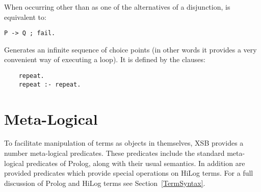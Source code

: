 \begin{description}
  
    When occurring other than as one of the alternatives of a disjunction,
    is equivalent to:
	\begin{center}
	{\tt P -> Q ; fail.}
	\end{center}

  
    Generates an infinite sequence of choice points (in other words it 
    provides a very convenient way of executing a loop). It is defined 
    by the clauses:
    \begin{center}
    \begin{minipage}{1.5in}
    \begin{verbatim}
	repeat.
	repeat :- repeat.
    \end{verbatim}
    \end{minipage}
    \end{center}

\end{description}


\section{Meta-Logical}\label{MetaLogical}

To facilitate manipulation of terms as objects in themselves,
XSB provides a number meta-logical predicates.  These
predicates include the standard meta-logical predicates of Prolog,
along with their usual semantics.  In addition are provided predicates
which provide special operations on HiLog terms.  For a full
discussion of Prolog and HiLog terms see Section~\ref{TermSyntax}.


